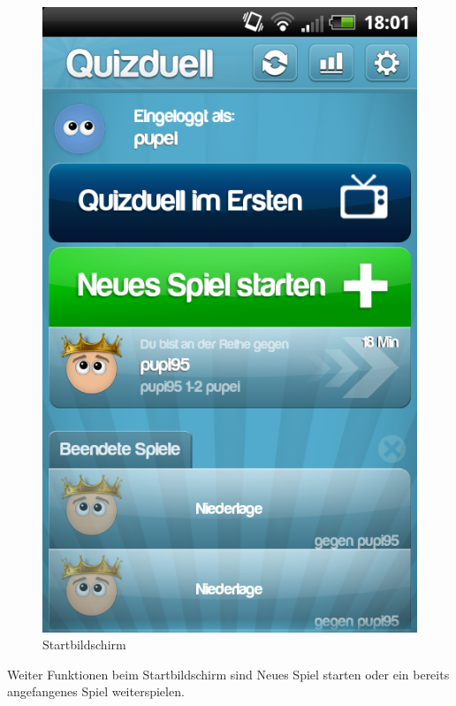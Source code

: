 \documentclass[fontsize=12pt,paper=a4,twoside]{scrartcl}
\begin{document}
\begin{figure}[H]
\centering
\includegraphics[scale=0.5]{Bilder/start.png}
\caption{Startbildschirm}
\end{figure}

Weiter Funktionen beim Startbildschirm sind Neues Spiel starten oder ein bereits angefangenes Spiel weiterspielen.\\
\end{document}
